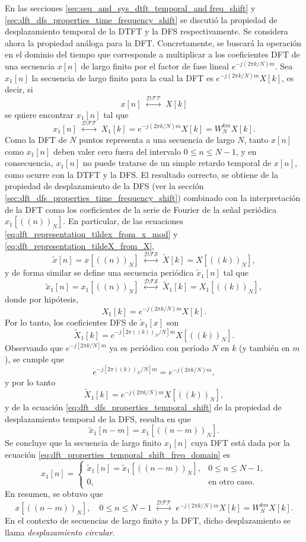 \documentclass[a4paper]{report}
\begin{document}
En las secciones \ref{sec:seq_and_sys_dtft_temporal_and freq_shift} y \ref{sec:dft_dfs_properties_time_frequency_shift} se discutió la propiedad de desplazamiento temporal de la DTFT y la DFS respectivamente. Se considera ahora la propiedad análoga para la DFT. Concretamente, se buscará la operación en el dominio del tiempo que corresponde a multiplicar a los coeficientes DFT de una secuencia \(x[n]\) de largo finito por el factor de fase lineal \(e^{-j(2\pi k/N)m}\). Sea \(x_1[n]\) la secuencia de largo finito para la cual la DFT es \(e^{-j(2\pi k/N)m}X[k]\), es decir, si
\[
 x[n]\;\overset{\mathcal{DFT}}{\longleftrightarrow}\;X[k]
\]
se quiere encontrar \(x_1[n]\) tal que 
\[
 x_1[n]\;\overset{\mathcal{DFT}}{\longleftrightarrow}\;X_1[k]=e^{-j(2\pi k/N)m}X[k]=W_N^{km}X[k].
\]
Como la DFT de \(N\) puntos representa a una secuencia de largo \(N\), tanto \(x[n]\) como \(x_1[n]\) deben valer cero fuera del intervalo \(0\leq n\leq N-1\), y en consecuencia, \(x_1[n]\) no puede tratarse de un simple retardo temporal de \(x[n]\), como ocurre con la DTFT y la DFS. El resultado correcto, se obtiene de la propiedad de desplazamiento de la DFS (ver la sección 
\ref{sec:dft_dfs_properties_time_frequency_shift}) combinado con la interpretación de la DFT como los coeficientes de la serie de Fourier de la señal periódica \(x_1[((n))_N]\). En particular, de las ecuaciones \ref{eq:dft_representation_tildex_from_x_mod} y \ref{eq:dft_representation_tildeX_from_X},
\[
 \tilde{x}[n]=x[((n))_N]\;\overset{\mathcal{DFS}}{\longleftrightarrow}\;\tilde{X}[k]=X[((k))_N],
\]
y de forma similar se define una secuencia periódica \(\tilde{x}_1[n]\) tal que 
\[
 \tilde{x}_1[n]=x_1[((n))_N]\;\overset{\mathcal{DFS}}{\longleftrightarrow}\;\tilde{X}_1[k]=X_1[((k))_N],
\]
donde por hipótesis,
\begin{equation}\label{eq:dft_properties_temporal_shift_freq_domain}
 X_1[k]=e^{-j(2\pi k/N)m}X[k]. 
\end{equation}
Por lo tanto, los coeficientes DFS de \(\tilde{x}_1[x]\) son
\[
 \tilde{X}_1[k]=e^{-j[2\pi((k))_N/N]m}X[((k))_N].
\]
Observando que \(e^{-j[2\pi k/N]m}\) ya es periódico con período \(N\) en \(k\) (y también en \(m\)), se cumple que 
\[
 e^{-j[2\pi((k))_N/N]m}=e^{-j(2\pi k/N)m},
\]
y por lo tanto
\[
 \tilde{X}_1[k]=e^{-j(2\pi k/N)m}X[((k))_N],
\]
y de la ecuación \ref{eq:dft_dfs_properties_temporal_shift} de la propiedad de desplazamiento temporal de la DFS, resulta en que 
\[
 \tilde{x}_1[n-m]=x_1[((n-m))_N].
\]
Se concluye que la secuencia de largo finito \(x_1[n]\) cuya DFT está dada por la ecuación \ref{eq:dft_properties_temporal_shift_freq_domain} es
\[
 x_1[n]=
 \left\{
 \begin{array}{ll}
  \tilde{x}_1[n]=\tilde{x}_1[((n-m))_N], & 0\leq n\leq N-1,\\
  0, & \textrm{en otro caso.}
 \end{array}
 \right.  
\]
En resumen, se obtuvo que 
\begin{equation}\label{eq:dft_properties_circular_shift}
 x[((n-m))_N],\quad0\leq n\leq N-1
  \;\overset{\mathcal{DFT}}{\longleftrightarrow}\;
  e^{-j(2\pi k/N)m}X[k]=W_N^{km}X[k].
\end{equation}
En el contexto de secuencias de largo finito y la DFT, dicho desplazamiento se llama \emph{desplazamiento circular}.
\end{document}
